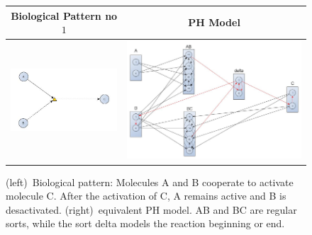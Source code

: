 \documentclass[11pt,a4paper,twoside]{epig}
\begin{document}
\begin{figure}[ht]
\begin{tabular}{|c|c|}
\hline
Biological Pattern no $1$ & PH Model \\
\hline
 \includegraphics[scale=0.3]{./imagesannexe/phdrawings/1cyt.jpg} & \includegraphics[scale=0.15]{./imagesannexe/phdrawings/1ph.jpg} \\
 \hline
\end{tabular}
\caption{\label{fig:pattern:1}
(left)~Biological pattern: Molecules A and B cooperate to activate molecule C. After the activation of C, A remains 
active and B is desactivated.
(right)~equivalent PH model. AB and BC are regular sorts, while the sort delta models the reaction beginning or end.
}
\end{figure}
\end{document}
